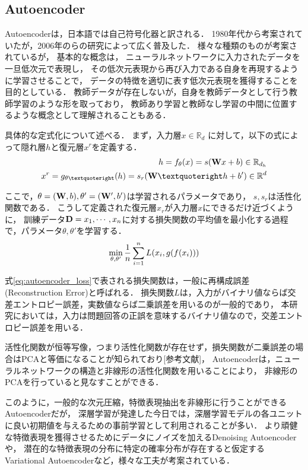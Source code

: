 \subsection{Autoencoder}
Autoencoderは，日本語では自己符号化器と訳される．
1980年代から考案されていたが，2006年の\cite{hinton2006reducing}らの研究によって広く普及した．
様々な種類のものが考案されているが，
基本的な概念は，
ニューラルネットワークに入力されたデータを一旦低次元で表現し，
その低次元表現から再び入力である自身を再現するように学習させることで，
データの特徴を適切に表す低次元表現を獲得することを目的としている．
教師データが存在しないが，自身を教師データとして行う教師学習のような形を取っており，
教師あり学習と教師なし学習の中間に位置するような概念として理解されることもある．


具体的な定式化について述べる．
まず，入力層$x \in \mathbb{R}_d$
に対して，以下の式によって隠れ層$h$と復元層$x^r$を定義する．
\begin{eqnarray} 
\label{eq:autoencoder_hidden}
{h = f_\theta(x) = s({\bf W} x + b)\in\mathbb R_{d_h}}
\\
\label{eq:autoencoder_reconstruct}
{x^r = g_{\theta’}(h) = s_r({\bf W’} h + b')\in\mathbb R^d}
\end{eqnarray} 

ここで，$\theta=({\bf W}, b), \theta'=({\bf W'}, b')$は学習されるパラメータであり，
$s, s_r$は活性化関数である．
こうして定義された復元層$x_r$が入力層$x$にできるだけ近づくように，
訓練データ${\bf D} = x_1, \cdots, x_n$に対する損失関数の平均値を最小化する過程で，パラメータ$\theta, \theta'$を学習する．
\begin{equation}
\label{eq:autoencoder_loss}
{\min_{\theta, \theta'} {1\over n}\sum_{i=1}^n L(x_i, g(f(x_i)))}
\end{equation}

式\ref{eq:autoencoder_loss}で表される損失関数は，一般に再構成誤差(Reconstruction Error)と呼ばれる．
損失関数$L$は，入力がバイナリ値ならば交差エントロピー誤差，実数値ならば二乗誤差を用いるのが一般的であり，%
本研究においては，入力は問題回答の正誤を意味するバイナリ値なので，交差エントロピー誤差を用いる．

活性化関数が恒等写像，つまり活性化関数が存在せず，損失関数が二乗誤差の場合はPCAと等価になることが知られており[参考文献]，
Autoencoderは，ニューラルネットワークの構造と非線形の活性化関数を用いることにより，
非線形のPCAを行っていると見なすことができる．

このように，一般的な次元圧縮，特徴表現抽出を非線形に行うことができるAutoencoderだが，
深層学習が発達した今日では，深層学習モデルの各ユニットに良い初期値を与えるための事前学習として利用されることが多い\cite{erhan2010does}．
より頑健な特徴表現を獲得させるためにデータにノイズを加えるDenoising Autoencoder\cite{vincent2008extracting}や，
潜在的な特徴表現の分布に特定の確率分布が存在すると仮定するVariational Autoencoder\cite{kingma2014semi}など，様々な工夫が考案されている．



